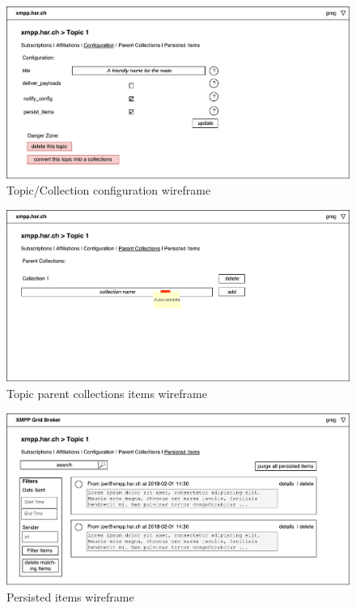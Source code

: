 \begin{figure}[h]
    \centering
    \includegraphics[width=1\linewidth]{resources/wireframe_10}
    \caption{Topic/Collection configuration wireframe}
\end{figure}

\begin{figure}[h]
    \centering
    \includegraphics[width=1\linewidth]{resources/wireframe_11}
    \caption{Topic parent collections items wireframe}
\end{figure}

\begin{figure}[h]
    \centering
    \includegraphics[width=1\linewidth]{resources/wireframe_12}
    \caption{Persisted items wireframe}
\end{figure}